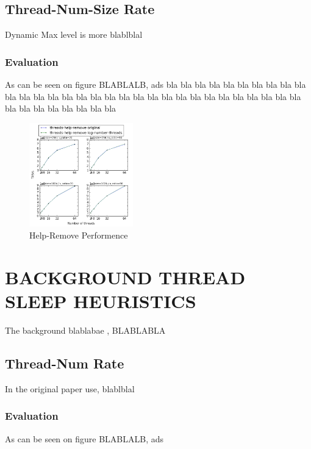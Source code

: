 \documentclass{article}
\begin{document}
\subsection{Thread-Num-Size Rate}
\label{ssec:tns}

Dynamic Max level is more blablblal

\subsubsection{Evaluation}
\label{sssec:tns-evl}

As can be seen on figure BLABLALB, ads
bla bla bla bla bla bla
bla bla bla bla bla 
bla bla bla bla bla bla
bla bla bla bla bla 
bla bla bla bla bla bla
bla bla bla bla bla 
bla bla bla bla bla bla

\begin{figure}
	\caption{Help-Remove Performence}
	\centering
	\includegraphics[width=0.4\textwidth]{help-remove_plot}
\end{figure}

\section{BACKGROUND THREAD SLEEP HEURISTICS}
\label{sec:bts}

The background blablabae , BLABLABLA

\subsection{Thread-Num Rate}
\label{ssec:dsrs}

In the original paper use, blablblal

\subsubsection{Evaluation}
\label{sssec:dsrs-evl}

As can be seen on figure BLABLALB, ads
\end{document}
